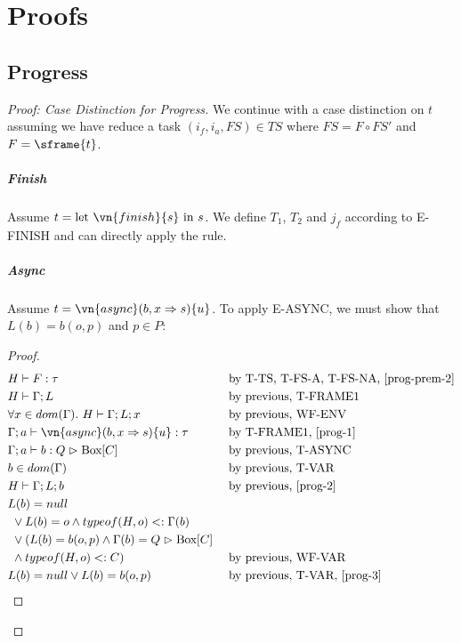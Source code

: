 
\chapter{Proofs}
\section{Progress}
\begin{proof}[Proof: Case Distinction for Progress]
We continue with a case distinction on $t$ assuming we have reduce a task $(i_f, i_a, FS) \in TS$ where $FS = F \circ FS'$ and $F = \sframe{t}$.

\paragraph{Finish}
Assume $t = \text{let } \vn{finish}\{s\} \text{ in } s$. We define $T_1$, $T_2$ and $j_f$ according to E-FINISH and can directly apply the rule.

\paragraph{Async}
Assume $t = \vn{async}(b, x \Rightarrow s)\{ u \}$. To apply E-ASYNC, we must show that $L(b) = b(o,p)$ and $p \in P$:

\begin{proof}
\begin{alignat}{2}
        &H \vdash F : \tau && \text{ by T-TS, T-FS-A, T-FS-NA, \cref{prog-prem-2}} \label{prog-1}\\
        &H \vdash \Gamma; L && \text{ by previous, T-FRAME1}\\
        &\forall x \in dom(\Gamma).\ H \vdash \Gamma; L; x && \text{ by previous, WF-ENV}\label{prog-2}\\
        &\Gamma; a \vdash \vn{async}(b, x \Rightarrow s) \{ u \} : \tau && \text{ by T-FRAME1, \cref{prog-1}}\\
        &\Gamma; a \vdash b : Q \vartriangleright \text{Box}[C] && \text{ by previous, T-ASYNC}\label{prog-3}\\
        &b \in dom(\Gamma) && \text{ by previous, T-VAR}\\
        &H \vdash \Gamma; L; b && \text{ by previous, \cref{prog-2}}\\
\nonumber&L(b) = null\\
\nonumber&\ \vee L(b) = o \wedge typeof(H, o) <: \Gamma(b)\\
\nonumber&\ \vee (L(b) = b(o, p) \wedge \Gamma(b) = Q \vartriangleright \text{Box}[C]\\
        &\ \wedge typeof(H, o) <: C) && \text{ by previous, WF-VAR}\\
        &L(b) = null \vee L(b) = b(o,p) && \text{ by previous, T-VAR, \cref{prog-3}}
\end{alignat}


\end{proof}
\end{proof}
